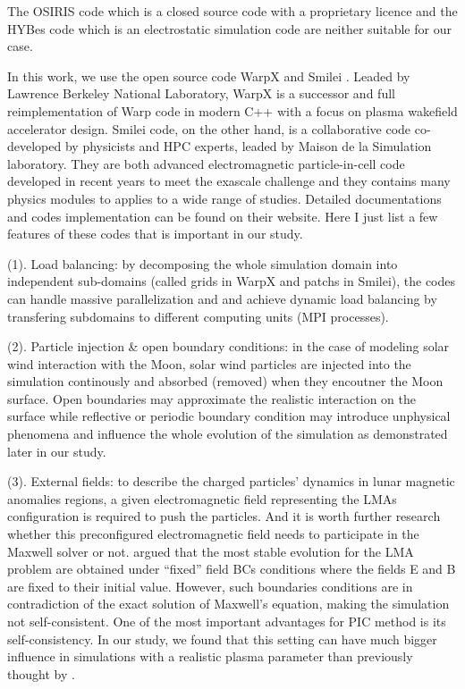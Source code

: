 The OSIRIS code which is a closed source code with a proprietary licence and the HYBes code which is an electrostatic simulation code are neither suitable for our case.

In this work, we use the open source code WarpX \citep{vayWarpXNewExascale2018} and Smilei \citep{derouillatSmileiCollaborativeOpensource2018}. Leaded by Lawrence Berkeley National Laboratory, WarpX is a successor and full reimplementation of Warp code in modern C++ with a focus on plasma wakeﬁeld accelerator design. Smilei code, on the other hand, is a collaborative code co-developed by physicists and HPC experts, leaded by Maison de la Simulation laboratory. They are both advanced electromagnetic particle-in-cell code developed in recent years to meet the exascale challenge and they contains many physics modules to applies to a wide range of studies. Detailed documentations and codes implementation can be found on their website. Here I just list a few features of these codes that is important in our study.

(1). Load balancing: by decomposing the whole simulation domain into independent sub-domains (called grids in WarpX and patchs in Smilei), the codes can handle massive parallelization and and achieve dynamic load balancing by transfering subdomains to different computing units (MPI processes).

(2). Particle injection \& open boundary conditions: in the case of modeling solar wind interaction with the Moon, solar wind particles are injected into the simulation continously and absorbed (removed) when they encoutner the Moon surface. Open boundaries may approximate the realistic interaction on the surface while reflective or periodic boundary condition may introduce unphysical phenomena and influence the whole evolution of the simulation as demonstrated later in our study.

(3). External fields: to describe the charged particles' dynamics in lunar magnetic anomalies regions, a given electromagnetic field representing the LMAs configuration is required to push the particles. And it is worth further research whether this preconfigured electromagnetic field needs to participate in the Maxwell solver or not. \cite{decaGeneralMechanismDynamics2015} argued that the most stable evolution for the LMA problem are obtained under “fixed” field BCs conditions where the fields E and B are fixed to their initial value. However, such boundaries conditions are in contradiction of the exact  solution of Maxwell's equation, making the simulation not self-consistent. One of the most important advantages for PIC method is its self-consistency. In our study, we found that this setting can have much bigger influence  in simulations with a realistic plasma parameter than previously thought by \cite{decaGeneralMechanismDynamics2015}.

